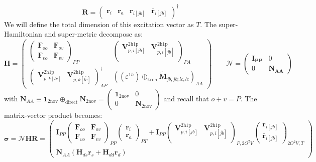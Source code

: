 \[
\bm{R} = 
\begin{pmatrix}
\bm{r}_i &\bm{r}_a &
\bm{r}_{i[jb]} &
\bm{\bar{r}}_{i[jb]}
\end{pmatrix}^\dag
\]
We will define the total dimension of this excitation vector as $T$.
The super-Hamiltonian and super-metric decompose as:
\[
\bm{H} =
\begin{pmatrix}
\begin{pmatrix}
    \bm{F}_{oo} & \bm{F}_{ov} \\
    \bm{F}_{vo} & \bm{F}_{vv}
\end{pmatrix}_{PP} &
\begin{pmatrix}
    \bm{V}^{2 \mathrm{h1p}}_{p,i[jb]} & \bm{V}^{2 \mathrm{h1p}}_{p,i[\bar{jb}]} \\
\end{pmatrix}_{PA} \\ 
\begin{pmatrix}
    \bm{V}^{2 \mathrm{h1p}}_{p,k[lc]} & \bm{V}^{2 \mathrm{h1p}}_{p,k[\bar{lc}]}
\end{pmatrix}^\dagger_{AP} &
\left(\left(\varepsilon^{1h}\right) \oplus_{\text{kron}} \bm{\tilde{M}}_{jb,jb;lc,lc}\right)_{AA}
\end{pmatrix}
\qquad
\bm{\mathcal{N}} =
\begin{pmatrix}
\bm{I_{PP}} & 0 \\[3pt]
0 & \bm{N_{AA}}
\end{pmatrix}
\]
 with $\bm{N}_{AA} \equiv \bm{1}_{\text{2nov}} \oplus_{\text{direct}} \bm{N}_{\text{2nov}}=\begin{pmatrix} \bm{1}_{\text{2nov}} & 0 \\ 0 & \bm{N}_{\text{2nov}} \end{pmatrix}$ and recall that $o+v=P$.
The matrix-vector product becomes:
\[
\bm{\sigma} = \bm{\mathcal{N}} \bm{H} \bm{R}
=
\begin{pmatrix}
\bm{I}_{PP} \begin{pmatrix}
\bm{F}_{oo} & \bm{F}_{ov} \\ \bm{F}_{vo} & \bm{F}_{vv}
\end{pmatrix}_{PP} \begin{pmatrix}
\bm{r}_i \\ \bm{r}_a
\end{pmatrix}_{PT} + \bm{I}_{PP} \begin{pmatrix}
    \bm{V}^{2 \mathrm{h1p}}_{p,i[jb]} & \bm{V}^{2 \mathrm{h1p}}_{p,i[\bar{jb}]} \\
\end{pmatrix}_{P,2O^2V} \begin{pmatrix}
    \bm{r}_{i[jb]} \\
\bm{\bar{r}}_{i[jb]}
\end{pmatrix}_{2O^2V,T} \\[6pt]
\bm{N}_{AA} \left( \bm{H}_{ds} \bm{r}_s + \bm{H}_{dd} \bm{r}_d \right)
\end{pmatrix}
\]
